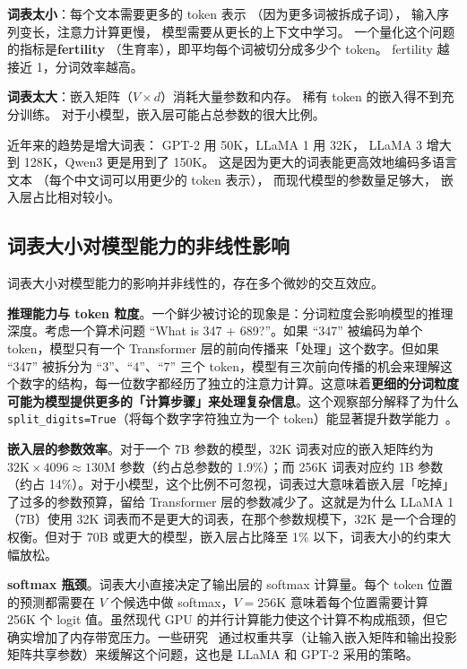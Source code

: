\textbf{词表太小}：每个文本需要更多的 token 表示
（因为更多词被拆成子词），
输入序列变长，注意力计算更慢，
模型需要从更长的上下文中学习。
一个量化这个问题的指标是\textbf{fertility}
（生育率），即平均每个词被切分成多少个 token。
fertility 越接近 1，分词效率越高。

\textbf{词表太大}：嵌入矩阵（$V \times d$）消耗大量参数和内存。
稀有 token 的嵌入得不到充分训练。
对于小模型，嵌入层可能占总参数的很大比例。

近年来的趋势是增大词表：
GPT-2 用 50K，LLaMA 1 用 32K，
LLaMA 3 增大到 128K，Qwen3 更是用到了 150K。
这是因为更大的词表能更高效地编码多语言文本
（每个中文词可以用更少的 token 表示），
而现代模型的参数量足够大，
嵌入层占比相对较小。

\subsection{词表大小对模型能力的非线性影响}

词表大小对模型能力的影响并非线性的，存在多个微妙的交互效应。

\textbf{推理能力与 token 粒度}。一个鲜少被讨论的现象是：分词粒度会影响模型的推理深度。考虑一个算术问题 “What is 347 + 689?”。如果 “347” 被编码为单个 token，模型只有一个 Transformer 层的前向传播来「处理」这个数字。但如果 “347” 被拆分为 “3”、“4”、“7” 三个 token，模型有三次前向传播的机会来理解这个数字的结构，每一位数字都经历了独立的注意力计算。这意味着\textbf{更细的分词粒度可能为模型提供更多的「计算步骤」来处理复杂信息}。这个观察部分解释了为什么 \texttt{split\_digits=True}（将每个数字字符独立为一个 token）能显著提升数学能力~\cite{mcleish2024abacus}。

\textbf{嵌入层的参数效率}。对于一个 7B 参数的模型，32K 词表对应的嵌入矩阵约为 $32\text{K} \times 4096 \approx 130\text{M}$ 参数（约占总参数的 1.9\%）；而 256K 词表对应约 1B 参数（约占 14\%）。对于小模型，这个比例不可忽视，词表过大意味着嵌入层「吃掉」了过多的参数预算，留给 Transformer 层的参数减少了。这就是为什么 LLaMA 1（7B）使用 32K 词表而不是更大的词表，在那个参数规模下，32K 是一个合理的权衡。但对于 70B 或更大的模型，嵌入层占比降至 1\% 以下，词表大小的约束大幅放松。

\textbf{softmax 瓶颈}。词表大小直接决定了输出层的 softmax 计算量。每个 token 位置的预测都需要在 $V$ 个候选中做 softmax，$V = 256\text{K}$ 意味着每个位置需要计算 256K 个 logit 值。虽然现代 GPU 的并行计算能力使这个计算不构成瓶颈，但它确实增加了内存带宽压力。一些研究~\cite{press2017tying} 通过权重共享（让输入嵌入矩阵和输出投影矩阵共享参数）来缓解这个问题，这也是 LLaMA 和 GPT-2 采用的策略。

